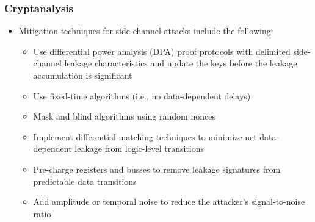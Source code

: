 \subsubsection{Cryptanalysis}
\begin{itemize}
    \item Mitigation techniques for side-channel-attacks include the following:
    \begin{itemize}
        \item Use differential power analysis (DPA) proof protocols with delimited side-channel leakage characteristics and update the keys before the leakage accumulation is significant
        \item Use fixed-time algorithms (i.e., no data-dependent delays)
        \item Mask and blind algorithms using random nonces
        \item Implement differential matching techniques to minimize net data-dependent leakage from logic-level transitions
        \item Pre-charge registers and busses to remove leakage signatures from predictable data transitions
        \item Add amplitude or temporal noise to reduce the attacker's signal-to-noise ratio
    \end{itemize}
\end{itemize}

